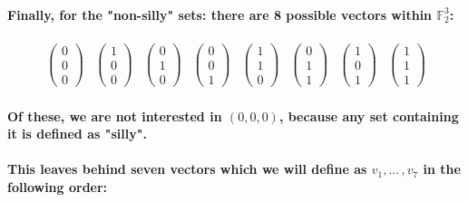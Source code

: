 \documentclass{article}
\begin{document}
\paragraph{\large
Finally, for the "non-silly" sets:
there are 8 possible vectors within $\mathbb{F}_2^3$:}

\begin{align}

\begin{pmatrix}
    0 \\ 0 \\ 0
\end{pmatrix}
&
\begin{pmatrix}
    1 \\ 0 \\ 0
\end{pmatrix}
&
\begin{pmatrix}
    0 \\ 1 \\ 0
\end{pmatrix}
&
\begin{pmatrix}
    0 \\ 0 \\ 1
\end{pmatrix}
&
\begin{pmatrix}
    1 \\ 1 \\ 0
\end{pmatrix}
&
\begin{pmatrix}
    0 \\ 1 \\ 1
\end{pmatrix}
&
\begin{pmatrix}
    1 \\ 0 \\ 1
\end{pmatrix}
&
\begin{pmatrix}
    1 \\ 1 \\ 1
\end{pmatrix}

\end{align}

\paragraph{\large
Of these, we are not interested in $(0, 0, 0)$, because any set containing it is defined as "silly".
}

\paragraph{\large
This leaves behind seven vectors which we will define as $v_1, ...\,, v_7$ in the following order:}
\end{document}
